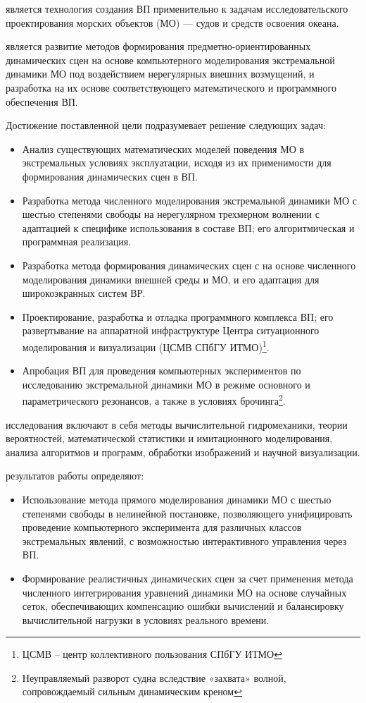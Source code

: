  является технология создания ВП применительно к задачам исследовательского проектирования морских объектов (МО) --- судов и средств освоения океана.

 является развитие методов формирования предметно-ориентированных динамических сцен на основе компьютерного моделирования экстремальной динамики МО под воздействием нерегулярных внешних возмущений, и разработка на их основе соответствующего математического и программного обеспечения ВП.

 Достижение поставленной цели подразумевает решение следующих задач:
\begin{itemize}
\item Анализ существующих математических моделей поведения МО в экстремальных условиях эксплуатации, исходя из их применимости для формирования динамических сцен в ВП.
\item Разработка метода численного моделирования экстремальной динамики МО с шестью степенями свободы на нерегулярном трехмерном волнении с адаптацией к специфике использования в составе ВП; его алгоритмическая и программная реализация.
\item Разработка метода формирования динамических сцен с на основе численного моделирования динамики внешней среды и МО, и его адаптация для широкоэкранных систем ВР.  
\item Проектирование, разработка и отладка программного комплекса ВП; его развертывание на аппаратной инфраструктуре Центра ситуационного моделирования и визуализации (ЦСМВ СПбГУ ИТМО)\footnote{ЦСМВ – центр коллективного пользования СПбГУ ИТМО}.
\item Апробация ВП для проведения компьютерных экспериментов по исследованию экстремальной динамики МО в режиме основного и параметрического резонансов, а также в условиях брочинга\footnote{Неуправляемый разворот судна вследствие «захвата» волной, сопровождаемый сильным динамическим креном}. 
\end{itemize}

 исследования включают в себя методы вычислительной гидромеханики, теории вероятностей, математической статистики и имитационного моделирования, анализа алгоритмов и программ, обработки изображений и научной визуализации.


 результатов работы определяют:
\begin{itemize}
	\item	Использование метода прямого моделирования динамики МО с шестью степенями свободы в нелинейной постановке, позволяющего унифицировать проведение компьютерного эксперимента для различных классов экстремальных явлений, с возможностью интерактивного управления через ВП.
	\item	Формирование реалистичных динамических сцен за счет применения метода численного интегрирования уравнений динамики МО на основе случайных сеток, обеспечивающих компенсацию ошибки вычислений и балансировку вычислительной нагрузки в условиях реального времени.
\end{itemize}


